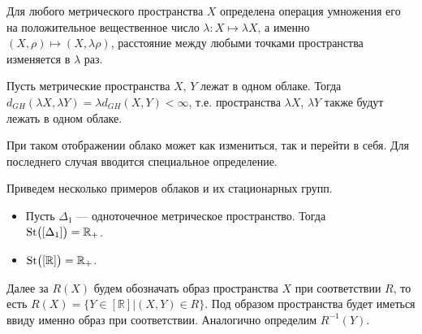  	 Для любого метрического пространства $X$ определена операция умножения его
на положительное вещественное число $\lambda\colon X\mapsto \lambda X$, а именно
$(X, \rho) \mapsto (X, \lambda \rho)$, расстояние между любыми точками
пространства изменяется в $\lambda$ раз.  \begin{remark} Пусть метрические
пространства $X$, $Y$ лежат в одном облаке. Тогда
$d_{GH}(\lambda X, \lambda Y) = \lambda d_{GH}(X,Y) < \infty$, т.е. пространства
$\lambda X$, $\lambda Y$ также будут лежать в одном облаке.  \end{remark}
  При таком отображении облако может как
измениться, так и перейти в себя. Для последнего случая вводится специальное
определение.  

Приведем несколько примеров облаков и их стационарных групп.
 	 
 	 \begin{itemize} \item Пусть $\Delta_1$ --- одноточечное метрическое
пространство.  Тогда\\ $\operatorname{St}\bigl([\Delta_1]\bigr) = \mathbb{R}_+$.  \item
$\operatorname{St}\bigl([\mathbb{R}]\bigr) = \mathbb{R}_+ $.  \end{itemize}
  Далее за $R(X)$ будем обозначать
образ пространства $X$ при соответствии $R$, то есть
$R(X) = \{Y \in [\mathbb{R}] | (X, Y) \in R\}$. Под образом пространства будет
иметься ввиду именно образ при соответствии.  Аналогично определим $R^{-1}(Y)$.

